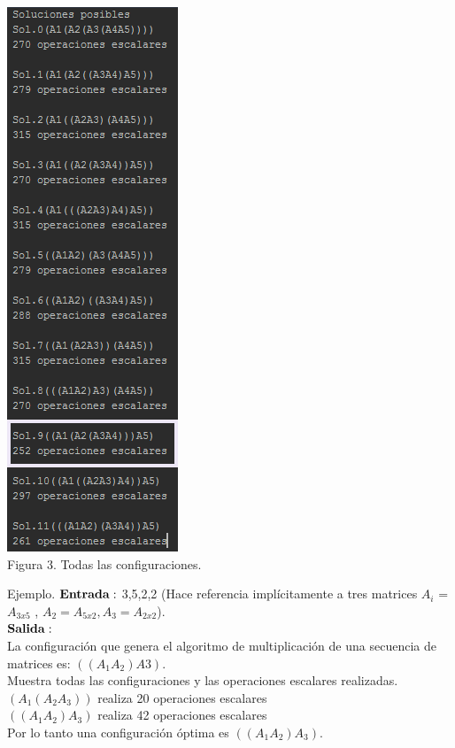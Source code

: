 \documentclass[spanish]{article}
\begin{document}
\begin{center}
		\includegraphics[scale=.75]{./imagenes/3.png}\\
		Figura 3. Todas las configuraciones.\\
	\end{center}
	


	Ejemplo.
	${\bf Entrada:}$ 3,5,2,2 (Hace referencia implícitamente a tres matrices $A_{i}$ = $A_{3x5}$ , $A_{2}= A_{5x2},A_{3}=A_{2x2}$).\\
	${\bf Salida:}$ \\
	La configuración que genera el algoritmo de multiplicación de una secuencia de matrices es: $((A_{1}A_{2})A{3})$.\\
	Muestra todas las configuraciones y las operaciones escalares realizadas.\\
	$(A_{1}(A_{2}A_{3}))$ realiza 20 operaciones escalares\\
	$((A_{1}A_{2})A_{3})$ realiza 42 operaciones escalares\\
	Por lo tanto una configuración óptima es $((A_{1}A_{2})A_{3})$.\\
\newpage
	
\end{document}

